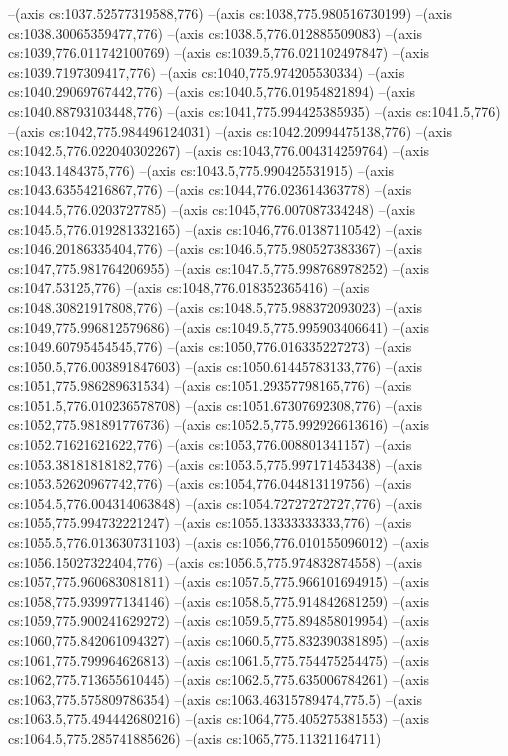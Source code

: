 --(axis cs:1037.52577319588,776)
--(axis cs:1038,775.980516730199)
--(axis cs:1038.30065359477,776)
--(axis cs:1038.5,776.012885509083)
--(axis cs:1039,776.011742100769)
--(axis cs:1039.5,776.021102497847)
--(axis cs:1039.7197309417,776)
--(axis cs:1040,775.974205530334)
--(axis cs:1040.29069767442,776)
--(axis cs:1040.5,776.01954821894)
--(axis cs:1040.88793103448,776)
--(axis cs:1041,775.994425385935)
--(axis cs:1041.5,776)
--(axis cs:1042,775.984496124031)
--(axis cs:1042.20994475138,776)
--(axis cs:1042.5,776.022040302267)
--(axis cs:1043,776.004314259764)
--(axis cs:1043.1484375,776)
--(axis cs:1043.5,775.990425531915)
--(axis cs:1043.63554216867,776)
--(axis cs:1044,776.023614363778)
--(axis cs:1044.5,776.0203727785)
--(axis cs:1045,776.007087334248)
--(axis cs:1045.5,776.019281332165)
--(axis cs:1046,776.01387110542)
--(axis cs:1046.20186335404,776)
--(axis cs:1046.5,775.980527383367)
--(axis cs:1047,775.981764206955)
--(axis cs:1047.5,775.998768978252)
--(axis cs:1047.53125,776)
--(axis cs:1048,776.018352365416)
--(axis cs:1048.30821917808,776)
--(axis cs:1048.5,775.988372093023)
--(axis cs:1049,775.996812579686)
--(axis cs:1049.5,775.995903406641)
--(axis cs:1049.60795454545,776)
--(axis cs:1050,776.016335227273)
--(axis cs:1050.5,776.003891847603)
--(axis cs:1050.61445783133,776)
--(axis cs:1051,775.986289631534)
--(axis cs:1051.29357798165,776)
--(axis cs:1051.5,776.010236578708)
--(axis cs:1051.67307692308,776)
--(axis cs:1052,775.981891776736)
--(axis cs:1052.5,775.992926613616)
--(axis cs:1052.71621621622,776)
--(axis cs:1053,776.008801341157)
--(axis cs:1053.38181818182,776)
--(axis cs:1053.5,775.997171453438)
--(axis cs:1053.52620967742,776)
--(axis cs:1054,776.044813119756)
--(axis cs:1054.5,776.004314063848)
--(axis cs:1054.72727272727,776)
--(axis cs:1055,775.994732221247)
--(axis cs:1055.13333333333,776)
--(axis cs:1055.5,776.013630731103)
--(axis cs:1056,776.010155096012)
--(axis cs:1056.15027322404,776)
--(axis cs:1056.5,775.974832874558)
--(axis cs:1057,775.960683081811)
--(axis cs:1057.5,775.966101694915)
--(axis cs:1058,775.939977134146)
--(axis cs:1058.5,775.914842681259)
--(axis cs:1059,775.900241629272)
--(axis cs:1059.5,775.894858019954)
--(axis cs:1060,775.842061094327)
--(axis cs:1060.5,775.832390381895)
--(axis cs:1061,775.799964626813)
--(axis cs:1061.5,775.754475254475)
--(axis cs:1062,775.713655610445)
--(axis cs:1062.5,775.635006784261)
--(axis cs:1063,775.575809786354)
--(axis cs:1063.46315789474,775.5)
--(axis cs:1063.5,775.494442680216)
--(axis cs:1064,775.405275381553)
--(axis cs:1064.5,775.285741885626)
--(axis cs:1065,775.11321164711)
